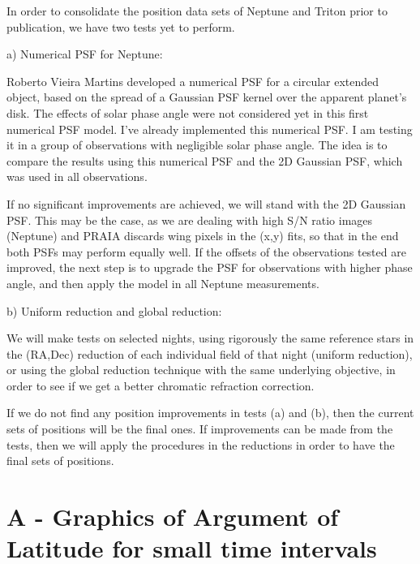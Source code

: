 \documentclass[12pt,a4paper]{report}
\begin{document}
In order to consolidate the position data sets of Neptune and Triton prior to publication, we have two tests yet to perform.


a) Numerical PSF for Neptune:

Roberto Vieira Martins developed a numerical PSF for a circular extended object, based on the spread of a Gaussian PSF kernel over the apparent planet's disk. The effects of solar phase angle were not considered yet in this first numerical PSF model. I've already implemented this numerical PSF. I am testing it in a group of observations with negligible solar phase angle. The idea is to compare the results using this numerical PSF and the 2D Gaussian PSF, which was used in all observations.

If no significant improvements are achieved, we will stand with the 2D Gaussian PSF. This may be the case, as we are dealing with high S/N ratio images (Neptune) and PRAIA discards wing pixels in the (x,y) fits, so that in the end both PSFs may perform equally well. If the offsets of the observations tested are improved, the next step is to upgrade the PSF for observations with higher phase angle, and then apply the model in all Neptune measurements.


b) Uniform reduction and global reduction:

We will make tests on selected nights, using rigorously the same reference stars in the (RA,Dec) reduction of each individual field of that night (uniform reduction), or using the global reduction technique with the same underlying objective, in order to see if we get a better chromatic refraction correction.


If we do not find any position improvements in tests (a) and (b), then the current sets of positions will be the final ones. If improvements can be made from the tests, then we will apply the procedures in the reductions in order to have the final sets of positions. 

\appendix

\section*{A - Graphics of Argument of Latitude for small time intervals \label{App:A}}
\end{document}
